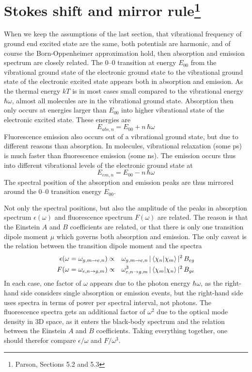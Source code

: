 \section{Stokes shift and mirror rule\protect\footnote{Parson, Sections 5.2 and 5.3}} 


When we keep the assumptions of the last section, that vibrational frequency of ground end excited state are the same, both potentials are harmonic, and of course the Born-Oppenheimer approximation hold, then absorption and emission spectrum are closely related. The 0--0 transition at energy $E_{00}$ from the vibrational ground state of the electronic ground state to the vibrational ground state of the electronic excited state appears both in absorption and emission. As the thermal energy $kT$ is in most cases small compared to the vibrational energy $\hbar \omega$, almost all molecules are in the vibrational ground state. Absorption then only occurs at energies larger than $E_{00}$ into higher vibrational state of the electronic excited state. These energies are
\[
  E_{abs, n} = E_{00} + n \, \hbar \omega
\]
Fluorescence emission also occurs out of a vibrational ground state, but due to different reasons than absorption. In molecules, vibrational relaxation  (some ps) is much faster than fluorescence emission (some ns). The emission occurs thus into different vibrational levels of the electronic ground state at
\[
  E_{em, n} = E_{00} - n \, \hbar \omega
\]
The spectral position of the absorption and emission peaks are thus mirrored around the 0--0 transition  energy $E_{00}$.

Not only the spectral positions, but also the amplitude of the peaks in absorption spectrum $\epsilon(\omega)$ and fluorescence spectrum $F(\omega)$ are related. The reason is that the Einstein $A$ and $B$ coefficients are related, or that there is only one transition dipole moment $\mu$ which governs both absorption and emission. The only caveat is the relation between the transition dipole moment and the spectra
\begin{eqnarray*}
   \epsilon(\omega  =  \omega_{g,m \rightarrow e,n} )  & \propto & \omega_{g,m \rightarrow e,n}  \,  | \braket{\chi_n |  \chi_m} |^2 
\, B_{eg} \\
   F(\omega =  \omega_{e,n \rightarrow g,m} ) & \propto & \omega_{e,n \rightarrow g,m}^3 \,  | \braket{\chi_m |  \chi_n} |^2 
\, B_{ge}
\end{eqnarray*}
In each case, one factor of $\omega$ appears due to the photon energy $\hbar \omega$, as the right-hand side considers single absorption or emission events,  but the right-hand side uses spectra in terms of power per spectral interval, not photons. The fluorescence spectra gets an additional factor of $\omega^2$ due to the optical mode density in 3D space, as it enters the black-body spectrum and the relation between the Einstein $A$ and $B$ coefficients.
Taking everything together, one should therefor compare $\epsilon / \omega$ and $F / \omega^3$.




